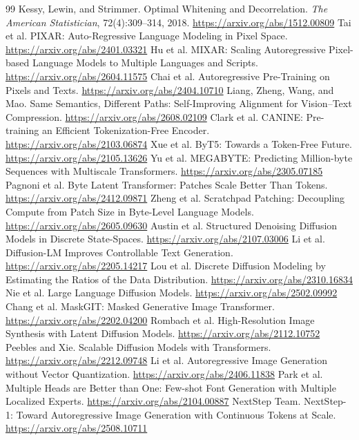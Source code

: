 \documentclass[11pt]{article}
\begin{document}
\begin{thebibliography}{99}
 Kessy, Lewin, and Strimmer. Optimal Whitening and Decorrelation. \emph{The American Statistician}, 72(4):309--314, 2018. \url{https://arxiv.org/abs/1512.00809}
 Tai et al. PIXAR: Auto-Regressive Language Modeling in Pixel Space. \url{https://arxiv.org/abs/2401.03321}
 Hu et al. MIXAR: Scaling Autoregressive Pixel-based Language Models to Multiple Languages and Scripts. \url{https://arxiv.org/abs/2604.11575}
 Chai et al. Autoregressive Pre-Training on Pixels and Texts. \url{https://arxiv.org/abs/2404.10710}
 Liang, Zheng, Wang, and Mao. Same Semantics, Different Paths: Self-Improving Alignment for Vision--Text Compression. \url{https://arxiv.org/abs/2608.02109}
 Clark et al. CANINE: Pre-training an Efficient Tokenization-Free Encoder. \url{https://arxiv.org/abs/2103.06874}
 Xue et al. ByT5: Towards a Token-Free Future. \url{https://arxiv.org/abs/2105.13626}
 Yu et al. MEGABYTE: Predicting Million-byte Sequences with Multiscale Transformers. \url{https://arxiv.org/abs/2305.07185}
 Pagnoni et al. Byte Latent Transformer: Patches Scale Better Than Tokens. \url{https://arxiv.org/abs/2412.09871}
 Zheng et al. Scratchpad Patching: Decoupling Compute from Patch Size in Byte-Level Language Models. \url{https://arxiv.org/abs/2605.09630}
 Austin et al. Structured Denoising Diffusion Models in Discrete State-Spaces. \url{https://arxiv.org/abs/2107.03006}
 Li et al. Diffusion-LM Improves Controllable Text Generation. \url{https://arxiv.org/abs/2205.14217}
 Lou et al. Discrete Diffusion Modeling by Estimating the Ratios of the Data Distribution. \url{https://arxiv.org/abs/2310.16834}
 Nie et al. Large Language Diffusion Models. \url{https://arxiv.org/abs/2502.09992}
 Chang et al. MaskGIT: Masked Generative Image Transformer. \url{https://arxiv.org/abs/2202.04200}
 Rombach et al. High-Resolution Image Synthesis with Latent Diffusion Models. \url{https://arxiv.org/abs/2112.10752}
 Peebles and Xie. Scalable Diffusion Models with Transformers. \url{https://arxiv.org/abs/2212.09748}
 Li et al. Autoregressive Image Generation without Vector Quantization. \url{https://arxiv.org/abs/2406.11838}
 Park et al. Multiple Heads are Better than One: Few-shot Font Generation with Multiple Localized Experts. \url{https://arxiv.org/abs/2104.00887}
 NextStep Team. NextStep-1: Toward Autoregressive Image Generation with Continuous Tokens at Scale. \url{https://arxiv.org/abs/2508.10711}

\end{thebibliography}
\end{document}

